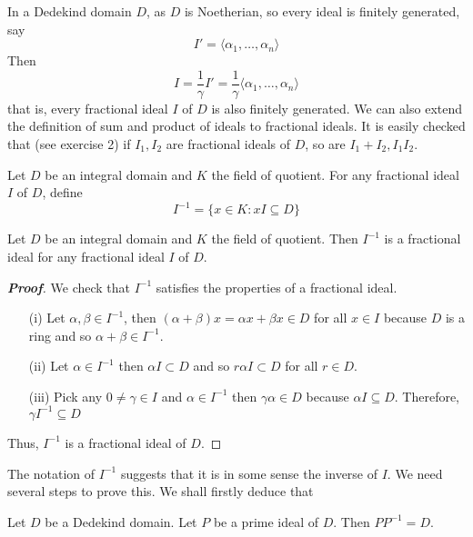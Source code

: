 In a Dedekind domain $D$, as $D$ is Noetherian, so every ideal is finitely generated, say
$$I'=\langle \alpha_1,\ldots,\alpha_n \rangle$$
Then
$$I=\frac{1}{\gamma}{I'}=\frac{1}{\gamma} \langle \alpha_1,\ldots,\alpha_n \rangle$$
that is, every fractional ideal $I$ of $D$ is also finitely generated. We can also extend the definition of
sum and product of ideals to fractional ideals. It is easily checked that (see exercise 2) if $I_1,I_2$ are fractional ideals of $D$, so are $I_1+I_2,I_1I_2$.
\begin{definition} Let $D$ be an integral domain and $K$ the field of quotient. For any fractional ideal $I$ of $D$, define
$$I^{-1}=\{x \in K: xI \subseteq D\}$$
\end{definition}
\begin{lemma} Let $D$ be an integral domain and $K$ the field of quotient. Then $I^{-1}$ is a fractional ideal for any fractional ideal $I$ of $D$.
\end{lemma}
\begin{proof}[\bf Proof] We check that $I^{-1}$ satisfies the properties of a fractional ideal.
\begin{enumerate}
\item[(i)] Let $\alpha,\beta \in I^{-1}$, then $(\alpha+\beta) x =\alpha x + \beta x \in D$ for all $x \in I$ because $D$ is a ring and so $\alpha+\beta \in I^{-1}$.
\item[(ii)] Let $\alpha \in I^{-1}$ then $\alpha I \subset D$ and so $r\alpha I \subset D$ for all $r \in D$.
\item[(iii)] Pick any $0 \neq \gamma \in I$ and $\alpha \in I^{-1}$ then $\gamma \alpha \in D$ because $\alpha I \subseteq D$. Therefore, $\gamma I^{-1} \subseteq D$
\end{enumerate}
Thus, $I^{-1}$ is a fractional ideal of $D$.
\end{proof}
The notation of $I^{-1}$ suggests that it is in some sense the inverse of $I$. We need several steps to prove this. We shall firstly deduce that
\begin{theorem} Let $D$ be a Dedekind domain. Let $P$ be a prime ideal of $D$. Then $P P^{-1}=D$.
\end{theorem}
